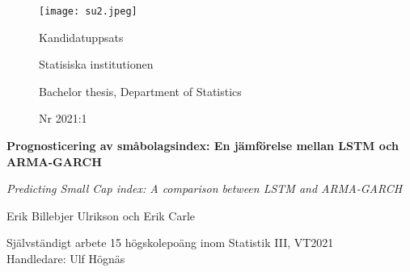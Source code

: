 \documentclass[11pt]{article}
\numberwithin{equation}{section}
\numberwithin{table}{section}
\numberwithin{figure}{section}
\begin{document}
\begin{titlepage}
\thispagestyle{empty}
	\begin{figure}[ht]
			\texttt{[image: su2.jpeg]}
			
	   \endminipage
		 \Large Kandidatuppsats \par
		 \large Statisiska institutionen \par
		  \small Bachelor thesis, Department of   Statistics \par
		   \large Nr 2021:1 \par
			
\endminipage
\end{figure}
	
	
\centering
\vspace{5cm}

{\large\bfseries Prognosticering av småbolagsindex: En jämförelse mellan LSTM och ARMA-GARCH\par}
	\vspace{0.5cm}

	
{\large\itshape Predicting Small Cap index: A comparison between LSTM and ARMA-GARCH \par}
	\vfill
	
	

{\Large Erik Billebjer Ulrikson och Erik Carle\par}
	\vspace{0.5cm}
	
\begin{flushleft}
Självständigt arbete 15 högskolepoäng inom Statistik III, VT2021 \\
Handledare: Ulf Högnäs\\

\end{flushleft}
\end{titlepage}

\newpage
\thispagestyle{empty}
\end{document}
